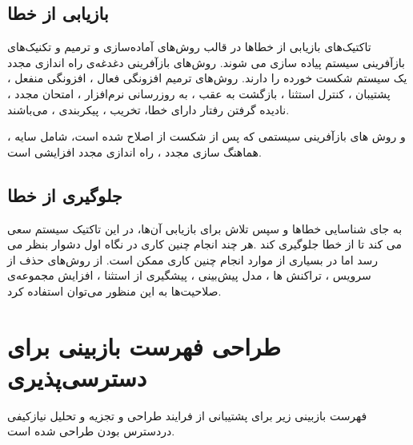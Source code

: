 \subsection{بازیابی از خطا}
تاکتیک‌های بازیابی از خطاها در قالب روش‌های آماده‌سازی و ترمیم و تکنیک‌های بازآفرینی سیستم پیاده سازی می شوند. روش‌های بازآفرینی دغدغه‌ی راه اندازی مجدد یک سیستم شکست خورده را دارند. روش‌های ترمیم 
افزونگی فعال ،
افزونگی منفعل ،
پشتیبان ،
کنترل استثنا ،
بازگشت به عقب ،
به روز‌رسانی نرم‌افزار ،
امتحان مجدد ،
نادیده گرفتن رفتار دارای خطا،
تخریب ،
پیکربندی ،
می‌باشند.

و روش های بازآفرینی سیستمی که پس از شکست از اصلاح شده است، شامل
سایه ،
هماهنگ سازی مجدد ،
راه اندازی مجدد افزایشی 
است.

\subsection{جلوگیری از خطا}
به جای شناسایی خطاها و سپس تلاش برای بازیابی آن‌ها، در این تاکتیک سیستم سعی می کند تا از خطا جلوگیری کند .هر چند انجام چنین کاری در نگاه اول دشوار بنظر می رسد اما در بسیاری از موارد انجام چنین کاری ممکن است.
از روش‌های
حذف از سرویس ،
تراکنش ها ،
مدل پیش‌بینی ،
پیشگیری از استثنا ،
افزایش مجموعه‌ی صلاحیت‌ها 
به این منظور می‌توان استفاده کرد.
\section{طراحی فهرست بازبینی برای دسترسی‌پذیری}
فهرست بازبینی زیر برای پشتیبانی از فرایند طراحی و تجزیه و تحلیل نیازکیفی در‌دسترس بودن طراحی شده است.
